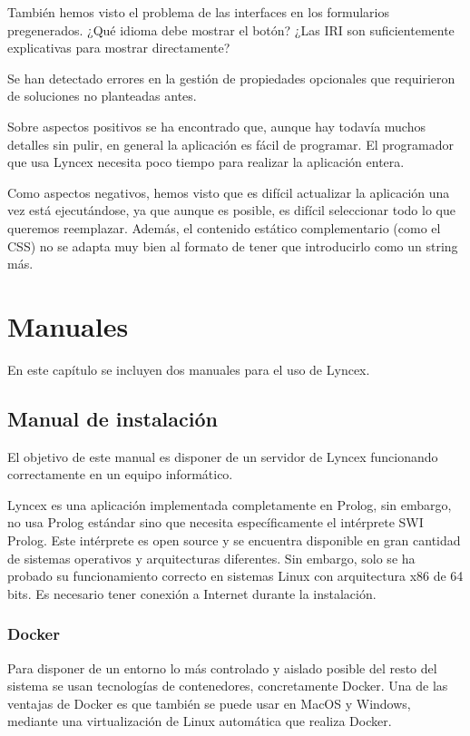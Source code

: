 \documentclass[12pt]{report} %
\begin{document}
También hemos visto el problema de las interfaces en los formularios pregenerados. ¿Qué idioma debe mostrar el botón? ¿Las IRI son suficientemente explicativas para mostrar directamente?

Se han detectado errores en la gestión de propiedades opcionales que requirieron de soluciones no planteadas antes.

Sobre aspectos positivos se ha encontrado que, aunque hay todavía muchos detalles sin pulir, en general la aplicación es fácil de programar. El programador que usa Lyncex necesita poco tiempo para realizar la aplicación entera. 

Como aspectos negativos, hemos visto que es difícil actualizar la aplicación una vez está ejecutándose, ya que aunque es posible, es difícil seleccionar todo lo que queremos reemplazar. Además, el contenido estático complementario (como el CSS) no se adapta muy bien al formato de tener que introducirlo como un string más.

\chapter{Manuales}

En este capítulo se incluyen dos manuales para el uso de Lyncex.

\section{Manual de instalación}

El objetivo de este manual es disponer de un servidor de Lyncex funcionando correctamente en un equipo informático.

Lyncex es una aplicación implementada completamente en Prolog, sin embargo, no usa Prolog estándar sino que necesita específicamente el intérprete SWI Prolog. Este intérprete es open source y se encuentra disponible en gran cantidad de sistemas operativos y arquitecturas diferentes. Sin embargo, solo se ha probado su funcionamiento correcto en sistemas Linux con arquitectura x86 de 64 bits. Es necesario tener conexión a Internet durante la instalación.

\subsection{Docker}

Para disponer de un entorno lo más controlado y aislado posible del resto del sistema se usan tecnologías de contenedores, concretamente Docker. Una de las ventajas de Docker es que también se puede usar en MacOS y Windows, mediante una virtualización de Linux automática que realiza Docker.
\end{document}
